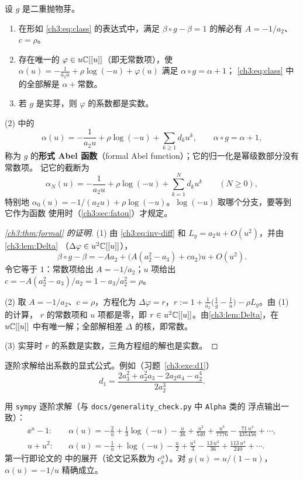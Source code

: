 \begin{theorem}[形式 Abel 函数]\label{ch3:thm:formal}
设 $g$ 是二重抛物芽。
\begin{enumerate}
\item 在形如 \eqref{ch3:eq:class} 的表达式中，满足 $\beta\circ g-\beta=1$ 的解必有
 $A=-1/a_2$、$c=\rho$。
\item 存在唯一的 $\varphi\in u\mathbb{C}[[u]]$（即无常数项），使
 $\alpha(u)=-\frac1{a_2u}+\rho\log(-u)+\varphi(u)$ 满足 $\alpha\circ g=\alpha+1$；
 \eqref{ch3:eq:class} 中的全部解是 $\alpha+\text{常数}$。
\item 若 $g$ 是实芽，则 $\varphi$ 的系数都是实数。
\end{enumerate}
\end{theorem}

\begin{definition}[形式 Abel 函数]\label{def:formal-abel}
(2) 中的
\[
 \alpha(u)=-\frac{1}{a_2u}+\rho\log(-u)+\sum_{k\ge1}d_ku^k,\qquad \alpha\circ g=\alpha+1,
\]
称为 $g$ 的\textbf{形式 Abel 函数}（formal Abel function）；它的归一化是幂级数部分没有常数项。
记它的截断为
\[
 \alpha_N(u)=-\frac{1}{a_2u}+\rho\log(-u)+\sum_{k=1}^Nd_ku^k\qquad(N\ge0),
\]
特别地 $\alpha_0(u)=-1/(a_2u)+\rho\log(-u)$。$\log(-u)$ 取哪个分支，要等到它作为函数
使用时（\cref{ch3:sec:fatou}）才规定。
\end{definition}

\begin{proof}[\cref{ch3:thm:formal} 的证明]
(1) 由 \eqref{ch3:eq:inv-diff} 和 $L_g=a_2u+O(u^2)$，并由\cref{ch3:lem:Delta}
（$\Delta\varphi\in u^2\mathbb{C}[[u]]$），
\[
 \beta\circ g-\beta=-Aa_2+\bigl(A(a_2^2-a_3)+ca_2\bigr)u+O(u^2).
\]
令它等于 $1$：常数项给出 $A=-1/a_2$；$u$ 项给出
$c=-A(a_2^2-a_3)/a_2=1-a_3/a_2^2=\rho$。

(2) 取 $A=-1/a_2$、$c=\rho$，方程化为
$\Delta\varphi=r$，$r:=1+\frac{1}{a_2}\bigl(\frac1g-\frac1u\bigr)-\rho L_g$。由 (1) 的计算，
$r$ 的常数项和 $u$ 项都是零，即 $r\in u^2\mathbb{C}[[u]]$。由\cref{ch3:lem:Delta}，在 $u\mathbb{C}[[u]]$
中有唯一解；全部解相差 $\Delta$ 的核，即常数。

(3) 实芽时 $r$ 的系数是实数，三角方程组的解也是实数。
\end{proof}

逐阶求解给出系数的显式公式。例如（习题~\ref{ch3:exe:d1}）
\begin{equation}\label{ch3:eq:d1}
 d_1=\frac{2a_3^2+a_2^2a_3-2a_2a_4-a_2^4}{2a_2^3}.
\end{equation}

\begin{example}\label{ch3:ex:formal}
用 \texttt{sympy} 逐阶求解（与 \texttt{docs/generality\_check.py} 中 \texttt{Alpha} 类的
浮点输出一致）：
\begin{align*}
 \ee^u-1:&\quad \alpha(u)=-\frac2u+\frac13\log(-u)-\frac{u}{36}+\frac{u^2}{540}+\frac{u^3}{7776}-\frac{71\,u^4}{435456}+\cdots,\\
 u+u^2:&\quad \alpha(u)=-\frac1u+\log(-u)-\frac{u}{2}+\frac{u^2}{3}-\frac{13\,u^3}{36}+\frac{113\,u^4}{240}+\cdots.
\end{align*}
第一行即论文的 \cite[\S2.1]{KneserPaper} 中的展开（论文记系数为 $c^\alpha_k$）。对
$g(u)=u/(1-u)$，$\alpha(u)=-1/u$ 精确成立。
\end{example}

